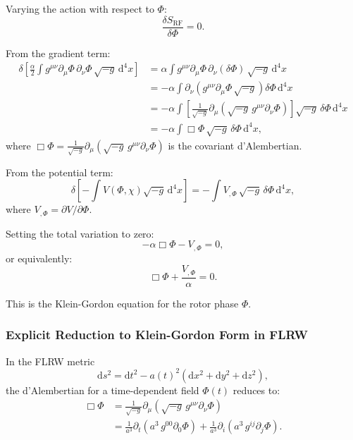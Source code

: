 \documentclass[11pt,a4paper]{article}
\numberwithin{equation}{section}
\theoremstyle{plain}
\theoremstyle{definition}
\theoremstyle{remark}
\newcommand{\dd}{\mathrm{d}}
\begin{document}
Varying the action with respect to $\Phi$:
\begin{equation}
\frac{\delta S_{\mathrm{RF}}}{\delta\Phi} = 0.
\end{equation}

From the gradient term:
\begin{align}
\delta\left[\frac{\alpha}{2}\int g^{\mu\nu}\partial_\mu\Phi\,\partial_\nu\Phi\,\sqrt{-g}\,\dd^4x\right] &= \alpha\int g^{\mu\nu}\partial_\mu\Phi\,\partial_\nu(\delta\Phi)\,\sqrt{-g}\,\dd^4x\\
&= -\alpha\int \partial_\nu\left(g^{\mu\nu}\partial_\mu\Phi\,\sqrt{-g}\right)\delta\Phi\,\dd^4x\\
&= -\alpha\int \left[\frac{1}{\sqrt{-g}}\partial_\mu\left(\sqrt{-g}\,g^{\mu\nu}\partial_\nu\Phi\right)\right]\sqrt{-g}\,\delta\Phi\,\dd^4x\\
&= -\alpha\int \Box\Phi\,\sqrt{-g}\,\delta\Phi\,\dd^4x,
\end{align}
where $\Box\Phi = \frac{1}{\sqrt{-g}}\partial_\mu(\sqrt{-g}\,g^{\mu\nu}\partial_\nu\Phi)$ is the covariant d'Alembertian.

From the potential term:
\begin{equation}
\delta\left[-\int V(\Phi,\chi)\sqrt{-g}\,\dd^4x\right] = -\int V_{,\Phi}\,\sqrt{-g}\,\delta\Phi\,\dd^4x,
\end{equation}
where $V_{,\Phi} = \partial V/\partial\Phi$.

Setting the total variation to zero:
\begin{equation}
-\alpha\Box\Phi - V_{,\Phi} = 0,
\end{equation}
or equivalently:
\begin{equation}
\Box\Phi + \frac{V_{,\Phi}}{\alpha} = 0.
\label{eq:phi-eom-general}
\end{equation}

This is the Klein-Gordon equation for the rotor phase $\Phi$.

\subsubsection{Explicit Reduction to Klein-Gordon Form in FLRW}

In the FLRW metric
\begin{equation}
\dd s^2 = \dd t^2 - a(t)^2\left(\dd x^2 + \dd y^2 + \dd z^2\right),
\end{equation}
the d'Alembertian for a time-dependent field $\Phi(t)$ reduces to:
\begin{align}
\Box\Phi &= \frac{1}{\sqrt{-g}}\partial_\mu\left(\sqrt{-g}\,g^{\mu\nu}\partial_\nu\Phi\right)\\
&= \frac{1}{a^3}\partial_t\left(a^3\,g^{00}\partial_0\Phi\right) + \frac{1}{a^3}\partial_i\left(a^3\,g^{ij}\partial_j\Phi\right).
\end{align}
\end{document}
